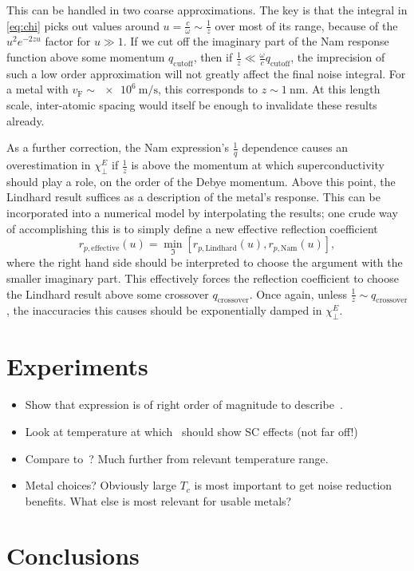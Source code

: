\documentclass{article}
\newcommand{\vf}{v_{\mathrm{F}}}
\begin{document}
This can be handled in two coarse approximations.
The key is that the integral in \eqref{eq:chi} picks out values around $u = \frac{c}{\omega} \sim \frac{1}{z}$ over most of its range, because of the $u^2 e^{-2 z u}$ factor for $u \gg 1$.
If we cut off the imaginary part of the Nam response function above some momentum $q_{\mathrm{cutoff}}$, then if $\frac{1}{z} \ll \frac{\omega}{c} q_{\mathrm{cutoff}}$, the imprecision of such a low order approximation will not greatly affect the final noise integral.
For a metal with $\vf \sim \SI{e6}{\m\per\s}$, this corresponds to $z \sim \SI{1}{\nm}$.
At this length scale, inter-atomic spacing would itself be enough to invalidate these results already.

As a further correction, the Nam expression's $\frac{1}{q}$ dependence causes an overestimation in $\chi_\perp^E$ if $\frac{1}{z}$ is above the momentum at which superconductivity should play a role, on the order of the Debye momentum.
Above this point, the Lindhard result suffices as a description of the metal's response.
This can be incorporated into a numerical model by interpolating the results;
one crude way of accomplishing this is to simply define a new effective reflection coefficient
\begin{equation}
	r_{p, \mathrm{effective}}(u) = \min_{\Im}\left[r_{p, \mathrm{Lindhard}}\left(u\right), r_{p, \mathrm{Nam}}\left(u\right)\right],
\end{equation}
where the right hand side should be interpreted to choose the argument with the smaller imaginary part.
This effectively forces the reflection coefficient to choose the Lindhard result above some crossover $q_{\mathrm{crossover}}$.
Once again, unless $\frac{1}{z} \sim q_{\mathrm{crossover}}$, the inaccuracies this causes should be exponentially damped in $\chi_\perp^E$.

\section{Experiments \label{sec:experiments}}
\begin{itemize}
	\item Show that expression is of right order of magnitude to describe~\cite{Tenberg2019}.
	\item Look at temperature at which~\cite{Tenberg2019} should show SC effects (not far off!)
	\item Compare to~\cite{Kolkowitz2015}?
	Much further from relevant temperature range.
	\item Metal choices?
	Obviously large $T_c$ is most important to get noise reduction benefits.
	What else is most relevant for usable metals?
\end{itemize}
\section{Conclusions \label{sec:conclusions}}

\printbibliography
\end{document}
